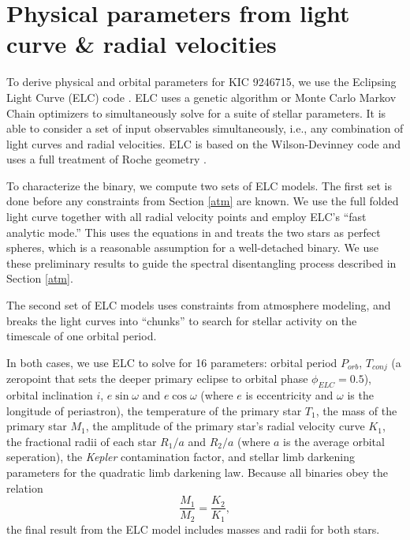 \section{Physical parameters from light curve \& radial velocities}\label{model}
To derive physical and orbital parameters for KIC 9246715, we use the Eclipsing Light Curve (ELC) code \citep{oro00}. ELC uses a genetic algorithm or Monte Carlo Markov Chain optimizers to simultaneously solve for a suite of stellar parameters. It is able to consider a set of input observables simultaneously, i.e., any combination of light curves and radial velocities. ELC is based on the Wilson-Devinney code \citep{wil71} and uses a full treatment of Roche geometry \citep{avn75}.

To characterize the binary, we compute two sets of ELC models. The first set is done before any constraints from Section \ref{atm} are known. We use the full folded light curve together with all radial velocity points and employ ELC's ``fast analytic mode.'' This uses the equations in \citep{gim06} and treats the two stars as perfect spheres, which is a reasonable assumption for a well-detached binary. We use these preliminary results to guide the spectral disentangling process described in Section \ref{atm}.

The second set of ELC models uses constraints from atmosphere modeling, and breaks the light curves into ``chunks'' to search for stellar activity on the timescale of one orbital period.

In both cases, we use ELC to solve for 16 parameters: orbital period $P_{orb}$, $T_{conj}$ (a zeropoint that sets the deeper primary eclipse to orbital phase $\phi_{ELC} = 0.5$), orbital inclination $i$, $e \sin \omega$ and $e \cos \omega$ (where $e$ is eccentricity and $\omega$ is the longitude of periastron), the temperature of the primary star $T_1$, the mass of the primary star $M_1$, the amplitude of the primary star's radial velocity curve $K_1$, the fractional radii of each star $R_1/a$ and $R_2/a$ (where $a$ is the average orbital seperation), the \emph{Kepler} contamination factor, and stellar limb darkening parameters for the quadratic limb darkening law. Because all binaries obey the relation
\begin{equation}
\frac{M_1}{M_2} = \frac{K_2}{K_1},
\end{equation}
the final result from the ELC model includes masses and radii for both stars.


%
